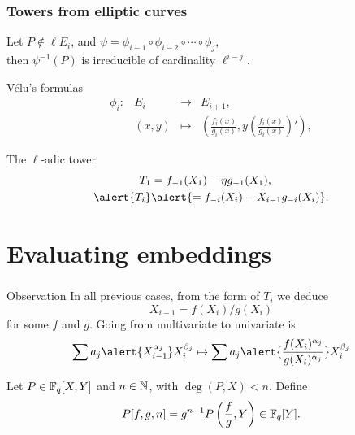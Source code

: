 \documentclass[12pt]{beamer}
\begin{document}

\begin{frame}
	\frametitle{Towers from elliptic curves}
	
        \begin{lemma}
          Let $P \not\in \ell E_i$, and $\psi=\phi_{i-1}\circ\phi_{i-2}\circ\cdots\circ\phi_{j}$,\\
          then $\psi^{-1}(P)$ is irreducible of cardinality $\ell^{i-j}$.
        \end{lemma}
	\vspace*{5mm}
	\begin{exampleblock}{V\'elu's formulas}
		\begin{equation*}
		  \begin{array}{crcl}
		    \phi_i: & E_i &\longrightarrow & E_{i+1},\\
		    & (x,y) &\longmapsto & \left(\frac{f_i(x)}{g_i(x)}, y\left(\frac{f_i(x)}{g_i(x)}\right)'\right),
		  \end{array}
		\end{equation*}
	\end{exampleblock}
	
	\begin{block}{The $\ell$-adic tower}
		\begin{align*}
		  T_1 &= f_{-1}(X_1) - \eta g_{-1}(X_1),\\ 
		  \alert{T_i} &\alert{= f_{-i}(X_i) - X_{i-1} g_{-i}(X_i)}.
		\end{align*}
	\end{block}
\end{frame}


\section{Evaluating embeddings}

\begin{frame}
  \frametitle{\insertsection}
  
  \begin{block}{Observation}
    In all previous cases, from the form of $T_i$ we deduce
    \[X_{i-1} = f(X_i)/g(X_i)\]
    for some $f$ and $g$.  
    Going from multivariate to univariate is
    \[\sum a_j \alert{X_{i-1}^{\alpha_j}} X_i^{\beta_j} \mapsto
    \sum a_j \alert{\frac{f(X_i)^{\alpha_j}}{g(X_i)^{\alpha_j}}} X_i^{\beta_j} \]
  \end{block}
  
  \begin{definition}
    Let $P \in \mathbb{F}_q[X,Y]$ and $n \in \mathbb{N}$, with $\deg(P,X)< n$. Define
    $$P[f,g,n] = g^{n-1} P\left (\frac fg, Y\right) \in \mathbb{F}_q[Y].$$
  \end{definition}
\end{frame}
\end{document}
